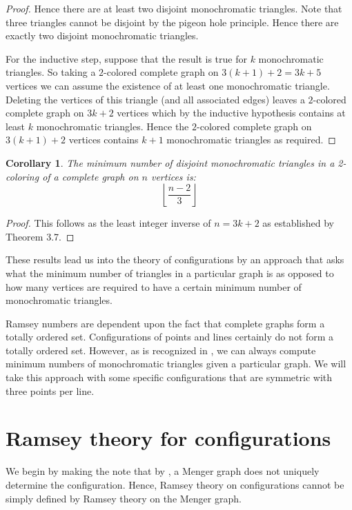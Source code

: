 \documentclass{article}
\newtheorem{cor}[thm]{Corollary}
\theoremstyle{definition}
\theoremstyle{remark}
\theoremstyle{definition}
\begin{document}
\begin{proof}
Hence there are at least two disjoint monochromatic triangles. Note that three triangles cannot be disjoint by the pigeon hole principle. Hence there are exactly two disjoint monochromatic triangles. 

For the inductive step, suppose that the result is true for $k$ monochromatic triangles. So taking a $2$-colored complete graph on $3(k+1)+2=3k+5$ vertices we can assume the existence of at least one monochromatic triangle. Deleting the vertices of this triangle (and all associated edges) leaves a $2$-colored complete graph on $3k+2$ vertices which by the inductive hypothesis contains at least $k$ monochromatic triangles. Hence the $2$-colored complete graph on $3(k+1)+2$ vertices contains $k+1$ monochromatic triangles as required.


\end{proof}

\begin{cor}
The minimum number of disjoint monochromatic triangles in a 2-coloring of a complete graph on $n$ vertices is: $$\left\lfloor  \frac{n-2}{3}  \right\rfloor$$
\end{cor}

\begin{proof}
This follows as the least integer inverse of $n=3k+2$ as established by Theorem 3.7.
\end{proof}



These results  lead us into the theory of configurations by an approach that asks what the minimum number of triangles in a particular graph is as opposed to how many vertices are required to have a certain minimum number of monochromatic triangles. 

Ramsey numbers are dependent upon the fact that complete graphs form a totally ordered set. Configurations of points and lines certainly do not form a totally ordered set. However, as is recognized in \cite{graham1990ramsey}, we can always compute minimum numbers of monochromatic triangles given a particular graph. We will take this approach with some specific configurations that are symmetric with three points per line.

\section{Ramsey theory for configurations}

We begin by making the note that by  \cite{mendelsohn1987planar}, a Menger graph does not uniquely determine the configuration. Hence, Ramsey theory on configurations cannot be simply defined by Ramsey theory on the Menger graph.
\end{document}

